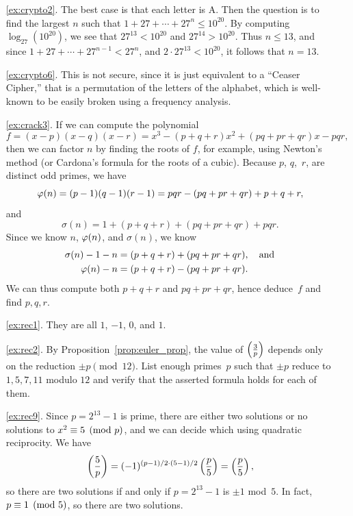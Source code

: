 \begin{itemize}
\begin{enumerate}
\end{enumerate}


\begin{enumerate}
\item[\ref{ex:crypto2}.] The best case is that each letter is A.
Then the question is to find the largest $n$ such that
$1 + 27 + \cdots + 27^n \leq 10^{20}$.
By computing $\log_{27}(10^{20})$, we see that
$27^{13}<10^{20}$ and $27^{14}>10^{20}$.  Thus $n\leq 13$,
and since $1 + 27  + \cdots + 27^{n-1} < 27^n$, and
$2\cdot 27^{13}<10^{20}$, it follows that $n=13$.

\item[\ref{ex:crypto6}.] This is not secure, since it is just
equivalent to a ``Ceaser Cipher,'' that is a permutation
of the letters of the alphabet, which is well-known to be
easily broken using a frequency analysis.

\item[\ref{ex:crack3}.] If we can compute the polynomial
$$f = (x-p)(x-q)(x-r)
  = x^3 - (p+q+r)x^2 + (pq+pr+qr)x - pqr,
$$
then we can factor $n$ by finding the roots of $f$, for example, using
Newton's method (or Cardona's formula for the roots of a cubic).
Because $p$, $q$,~$r$, are distinct odd primes, we have
$$\varphi(n) =(p-1)(q-1)(r-1) = pqr-(pq+pr+qr)+p+q+r,$$
and
$$\sigma(n) = 1 + (p+q+r)+(pq+pr+qr) + pqr.$$
Since we know $n$, $\varphi(n)$, and $\sigma(n)$, we know
\begin{align*}
\sigma(n)-1-n &= (p+q+r)+(pq+pr+qr),\quad\text{and}\\
\varphi(n)-n    &= (p+q+r)-(pq+pr+qr).
\end{align*}
We can thus compute
both $p+q+r$ and $pq+pr+qr$, hence deduce~$f$
and find $p,q,r$.
\end{enumerate}

\begin{enumerate}
\item[\ref{ex:rec1}.]  They are all $1$, $-1$, $0$, and $1$.

\item[\ref{ex:rec2}.]  By Proposition~\ref{prop:euler_prop},
the value of $\left(\frac{3}{p}\right)$ depends
only on the reduction $\pm p\pmod{12}$.  List enough primes~$p$ such that
$\pm p$ reduce to $1,5,7,11$ modulo $12$ and verify that
the asserted formula holds for each of them.

\item[\ref{ex:rec9}.] Since $p=2^{13}-1$ is prime, there
are either two solutions or no solutions to $x^2\equiv 5\pmod{p}$,
and we can decide which using quadratic reciprocity.
We have
$$\left(\frac{5}{p}\right) = (-1)^{(p-1)/2\cdot (5-1)/2}\left(\frac{p}{5}\right) = \left(\frac{p}{5}\right),$$
so there are two solutions if and only if $p=2^{13}-1$ is $\pm 1$
mod~$5$.  In fact, $p\equiv 1\pmod{5}$, so there are two solutions.


\end{enumerate}
\end{itemize}

